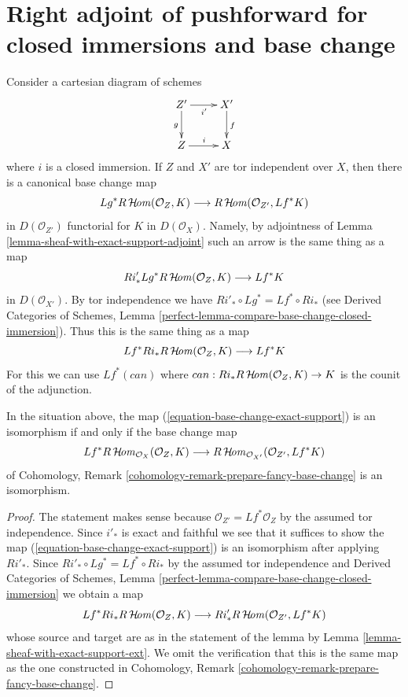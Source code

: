 \section{Right adjoint of pushforward for closed immersions and base change}
\label{section-sections-with-exact-support-base-change}

\noindent
Consider a cartesian diagram of schemes
$$
\xymatrix{
Z' \ar[r]_{i'} \ar[d]_g & X' \ar[d]^f \\
Z \ar[r]^i & X
}
$$
where $i$ is a closed immersion. If $Z$ and $X'$ are
tor independent over $X$, then there is a canonical
base change map
\begin{equation}
\label{equation-base-change-exact-support}
Lg^*R\mathop{\mathcal{H}\!\mathit{om}}\nolimits(\mathcal{O}_Z, K)
\longrightarrow
R\mathop{\mathcal{H}\!\mathit{om}}\nolimits(\mathcal{O}_{Z'}, Lf^*K)
\end{equation}
in $D(\mathcal{O}_{Z'})$ functorial for $K$ in $D(\mathcal{O}_X)$.
Namely, by adjointness of Lemma \ref{lemma-sheaf-with-exact-support-adjoint}
such an arrow is the same thing as a map
$$
Ri'_*Lg^*R\mathop{\mathcal{H}\!\mathit{om}}\nolimits(\mathcal{O}_Z, K)
\longrightarrow
Lf^*K
$$
in $D(\mathcal{O}_{X'})$. By tor independence we have
$Ri'_* \circ Lg^* = Lf^* \circ Ri_*$ (see
Derived Categories of Schemes, Lemma
\ref{perfect-lemma-compare-base-change-closed-immersion}).
Thus this is the same thing as a map
$$
Lf^*Ri_*R\mathop{\mathcal{H}\!\mathit{om}}\nolimits(\mathcal{O}_Z, K)
\longrightarrow
Lf^*K
$$
For this we can use $Lf^*(can)$ where
$can : Ri_* R\mathop{\mathcal{H}\!\mathit{om}}\nolimits(\mathcal{O}_Z, K) \to K$ is the
counit of the adjunction.

\begin{lemma}
\label{lemma-check-base-change-is-iso}
In the situation above, the map (\ref{equation-base-change-exact-support})
is an isomorphism if and only if the base change map
$$
Lf^*R\mathop{\mathcal{H}\!\mathit{om}}\nolimits_{\mathcal{O}_X}(\mathcal{O}_Z, K)
\longrightarrow
R\mathop{\mathcal{H}\!\mathit{om}}\nolimits_{\mathcal{O}_{X'}}(\mathcal{O}_{Z'}, Lf^*K)
$$
of Cohomology, Remark \ref{cohomology-remark-prepare-fancy-base-change}
is an isomorphism.
\end{lemma}

\begin{proof}
The statement makes sense because $\mathcal{O}_{Z'} = Lf^*\mathcal{O}_Z$
by the assumed tor independence.
Since $i'_*$ is exact and faithful we see that it suffices to show
the map (\ref{equation-base-change-exact-support})
is an isomorphism after applying $Ri'_*$. Since
$Ri'_* \circ Lg^* = Lf^* \circ Ri_*$ by the assumed tor independence and
Derived Categories of Schemes, Lemma
\ref{perfect-lemma-compare-base-change-closed-immersion}
we obtain a map
$$
Lf^*Ri_*R\mathop{\mathcal{H}\!\mathit{om}}\nolimits(\mathcal{O}_Z, K)
\longrightarrow
Ri'_*R\mathop{\mathcal{H}\!\mathit{om}}\nolimits(\mathcal{O}_{Z'}, Lf^*K)
$$
whose source and target are as in the statement of the lemma by
Lemma \ref{lemma-sheaf-with-exact-support-ext}. We omit the
verification that this is the same map as the one constructed
in Cohomology, Remark \ref{cohomology-remark-prepare-fancy-base-change}.
\end{proof}

